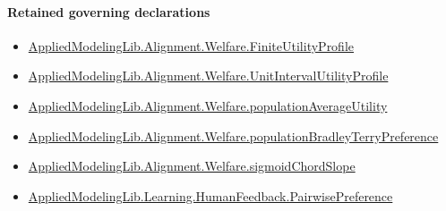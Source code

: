 \documentclass[10pt]{article}
\begin{document}
\paragraph{Retained governing declarations}
\begin{itemize}\raggedright
\item \hyperlink{library-prerequisite-56c0734f8877ddbe}{Applied\allowbreak{}Modeling\allowbreak{}Lib.\allowbreak{}Alignment.\allowbreak{}Welfare.\allowbreak{}Finite\allowbreak{}Utility\allowbreak{}Profile}
\item \hyperlink{library-prerequisite-cbe8afa0d6d1ba78}{Applied\allowbreak{}Modeling\allowbreak{}Lib.\allowbreak{}Alignment.\allowbreak{}Welfare.\allowbreak{}Unit\allowbreak{}Interval\allowbreak{}Utility\allowbreak{}Profile}
\item \hyperlink{library-prerequisite-15f4b442749deab2}{Applied\allowbreak{}Modeling\allowbreak{}Lib.\allowbreak{}Alignment.\allowbreak{}Welfare.\allowbreak{}population\allowbreak{}Average\allowbreak{}Utility}
\item \hyperlink{library-prerequisite-cf06d15d7f8b7c31}{Applied\allowbreak{}Modeling\allowbreak{}Lib.\allowbreak{}Alignment.\allowbreak{}Welfare.\allowbreak{}population\allowbreak{}Bradley\allowbreak{}Terry\allowbreak{}Preference}
\item \hyperlink{governing-declaration-a4d623b8c608b566}{Applied\allowbreak{}Modeling\allowbreak{}Lib.\allowbreak{}Alignment.\allowbreak{}Welfare.\allowbreak{}sigmoid\allowbreak{}Chord\allowbreak{}Slope}
\item \hyperlink{library-prerequisite-7e2db20cf087d9ba}{Applied\allowbreak{}Modeling\allowbreak{}Lib.\allowbreak{}Learning.\allowbreak{}Human\allowbreak{}Feedback.\allowbreak{}Pairwise\allowbreak{}Preference}
\end{itemize}
\end{document}
